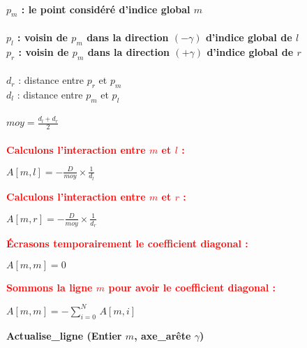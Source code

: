 \documentclass[11pt,a4paper]{article}
\begin{document}
\begin{algorithm}[H]
\SetAlgoLined
~\\
\textbf{$p_m$ : le point considéré d'indice global $m$}\\
~\\

\textbf{$p_l$ : voisin de $p_m$ dans la direction $(-\gamma)$ d'indice global de $l$}\\
\textbf{$p_r$ : voisin de $p_m$ dans la direction $(+\gamma)$ d'indice global de $r$}\\
~\\
$d_r$ : distance entre $p_r$ et $p_m$\\
$d_l$ : distance entre $p_m$ et $p_l$\\
~\\
$moy = \frac{d_l + d_r}{2}$\\
~\\
\textcolor{red}{\textbf{Calculons l'interaction entre $m$ et $l$ :}}
\begin{center}
$A [m, l] = - \frac{D}{moy} \times \frac{1}{d_l}$
\end{center}
\textcolor{red}{\textbf{Calculons l'interaction entre $m$ et $r$ :}}
\begin{center}
$A [m, r] = - \frac{D}{moy} \times \frac{1}{d_r}$
\end{center}
\textcolor{red}{\textbf{Écrasons temporairement le coefficient diagonal :}}
\begin{center}
$A[m,m] = 0$
\end{center}
\textcolor{red}{\textbf{Sommons la ligne $m$ pour avoir le coefficient diagonal :}}
\begin{center}
$A[m,m] = -\sum_{i=0}^{N}\,A[m, i]$
\end{center}

\caption{\textbf{Actualise\_ligne (Entier $m$, axe\_arête $\gamma$)}}
\end{algorithm}

\newpage
{}
\end{document}
